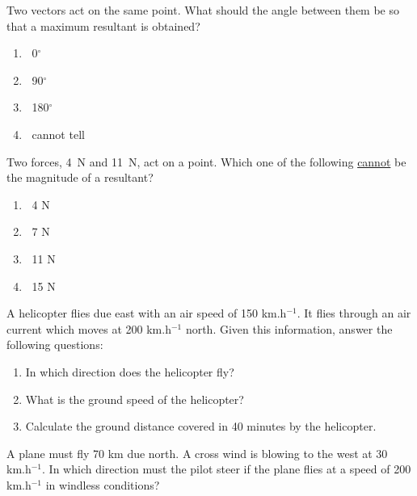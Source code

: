 \begin{eocexercises}{}
\begin{enumerate}
\begin{minipage}{\textwidth}
\item Two vectors act on the same point. What should the angle between them be so that a maximum resultant is obtained?
\begin{multicols}{4}
\begin{enumerate}
\item $\;\;$0$^\circ$
\item $\;\;$90$^\circ$
\item $\;\;$180$^\circ$
\item $\;\;$cannot tell
\end{enumerate}
\end{multicols}
\end{minipage}

\begin{minipage}{\textwidth}
\item Two forces, 4~N and 11~N, act on a point. Which one of the following \underline{cannot} be the magnitude of a resultant?
\begin{multicols}{4}
\begin{enumerate}
\item $\;\;$4 N
\item $\;\;$7 N
\item $\;\;$11 N
\item $\;\;$15 N
\end{enumerate}
\end{multicols}
\end{minipage}

% 
% 

\item A helicopter flies due east with an air speed of 150 km.h$^{-1}$. It flies through an air current which moves at 200 km.h$^{-1}$ north. Given this information, answer the following questions:
\begin{enumerate}
\item In which direction does the helicopter fly?
\item What is the ground speed of the helicopter?
\item Calculate the ground distance covered in 40 minutes by the helicopter. \end{enumerate}

\item A plane must fly 70 km due north. A cross wind is blowing to the west at 30 km.h$^{-1}$. In which direction must the pilot steer if the plane flies at a speed of 200 km.h$^{-1}$ in windless conditions?


\end{enumerate}
\end{eocexercises}
